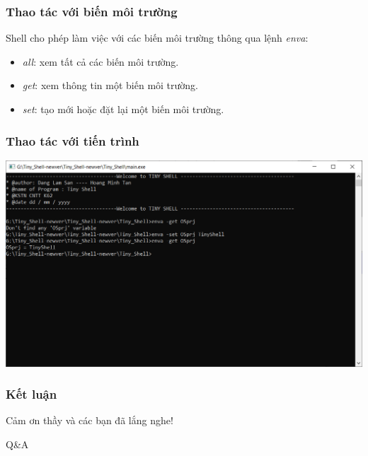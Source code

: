 \documentclass{beamer}
\begin{document}
\begin{frame}
\frametitle{Thao tác với biến môi trường}
Shell cho phép làm việc với các biến môi trường thông qua lệnh \textit{enva}:\pause
\begin{itemize}
\item \textit{all}: xem tất cả các biến môi trường.\pause
\item \textit{get}: xem thông tin một biến môi trường.\pause
\item \textit{set}: tạo mới hoặc đặt lại một biến môi trường.\pause
\end{itemize}
\end{frame}

\begin{frame}
\frametitle{Thao tác với tiến trình}
\begin{center}
\includegraphics[scale=0.45]{environment.png}
\end{center}
\end{frame}

\begin{frame}
\frametitle{Kết luận}
\begin{center}
\begin{huge}
 Cảm ơn thầy và các bạn đã lắng nghe!
\end{huge}
\end{center}
\begin{center}
\begin{LARGE}
Q\&A
\end{LARGE}
\end{center}
\end{frame}
\end{document}
